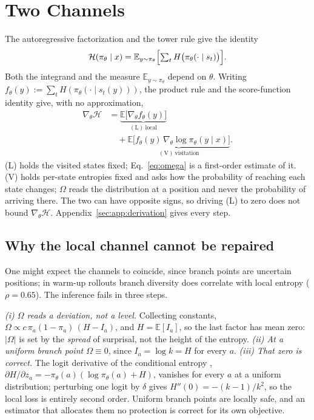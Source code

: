 \documentclass[11pt]{article}
\newcommand{\Htraj}{\mathcal{H}}
\newcommand{\Om}{\Omega}
\newcommand{\E}{\mathbb{E}}
\newcommand{\gradt}{\nabla_{\theta}}
\newcommand{\pit}{\pi_{\theta}}
\begin{document}
\section{Two Channels}
\label{sec:channels}

The autoregressive factorization and the tower rule give the identity
\begin{equation}
\Htraj(\pit \mid x) = \E_{y \sim \pit}\Bigl[\textstyle\sum_{t} H\bigl(\pit(\cdot \mid s_t)\bigr)\Bigr].
\label{eq:chain}
\end{equation}
Both the integrand and the measure $\E_{y\sim\pit}$ depend on $\theta$. Writing $f_\theta(y)
:= \sum_t H(\pit(\cdot \mid s_t(y)))$, the product rule and the score-function
identity give, with no approximation,
\begin{equation}
\begin{split}
\gradt \Htraj
&= \underbrace{\E\bigl[\gradt f_\theta(y)\bigr]}_{(\mathrm{L})\ \text{local}}\\
&\quad + \underbrace{\E\bigl[f_\theta(y)\,\gradt \log \pit(y \mid x)\bigr]}_{(\mathrm{V})\ \text{visitation}}.
\end{split}
\label{eq:twochannel}
\end{equation}
(L) holds the visited states fixed; Eq.~\eqref{eq:omega} is a first-order estimate
of it. (V) holds per-state entropies fixed and asks how the probability of reaching
each state changes; $\Om$ reads the distribution at a position and never the
probability of arriving there. The two can have opposite signs, so driving (L) to
zero does not bound $\gradt \Htraj$. Appendix~\ref{sec:app:derivation} gives every
step.

\subsection{Why the local channel cannot be repaired}
\label{sec:blind}

One might expect the channels to coincide, since branch points are uncertain
positions; in warm-up rollouts branch diversity does correlate with local entropy
($\rho = 0.65$). The inference fails in three steps.

\emph{(i) $\Om$ reads a deviation, not a level.} Collecting constants,
$\Om \propto c\,\pi_a(1-\pi_a)\,(H - I_a)$, and $H = \E[I_a]$, so the last factor
has mean zero: $|\Om|$ is set by the \emph{spread} of surprisal, not the height of
the entropy. \emph{(ii) At a uniform branch point $\Om \equiv 0$}, since $I_a = \log
k = H$ for every $a$. \emph{(iii) That zero is correct.} The logit derivative of the
conditional entropy \citep[Eq.~20]{steer},
$\partial H / \partial z_a = -\pit(a)(\log \pit(a) + H)$, vanishes for every $a$ at
a uniform distribution; perturbing one logit by $\delta$ gives
$H''(0) = -(k-1)/k^2$, so the local loss is entirely second order. Uniform branch
points are locally safe, and an estimator that allocates them no protection is
correct for its own objective.
\end{document}
